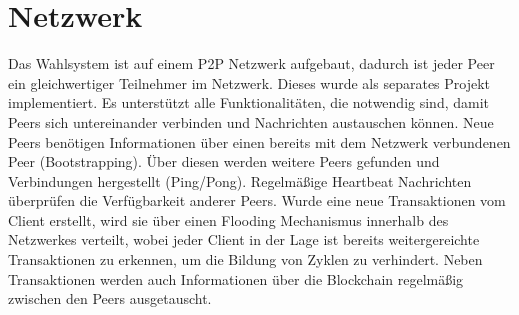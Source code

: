 \documentclass[colorback,accentcolor=tud1b]{tudreport}
\begin{document}
\section{Netzwerk}
Das Wahlsystem ist auf einem P2P Netzwerk aufgebaut, dadurch ist jeder Peer ein gleichwertiger Teilnehmer im Netzwerk. Dieses wurde als separates Projekt implementiert. Es unterstützt alle Funktionalitäten, die notwendig sind, damit Peers sich untereinander verbinden und Nachrichten austauschen können. Neue Peers benötigen Informationen über einen bereits mit dem Netzwerk verbundenen Peer (Bootstrapping). Über diesen werden weitere Peers gefunden und Verbindungen hergestellt (Ping/Pong). Regelmäßige Heartbeat Nachrichten überprüfen die Verfügbarkeit anderer Peers. Wurde eine neue Transaktionen vom Client erstellt, wird sie über einen Flooding Mechanismus innerhalb des Netzwerkes verteilt, wobei jeder Client in der Lage ist bereits weitergereichte Transaktionen zu erkennen, um die Bildung von Zyklen zu verhindert. Neben Transaktionen werden auch Informationen über die Blockchain regelmäßig zwischen den Peers ausgetauscht.
\end{document}
